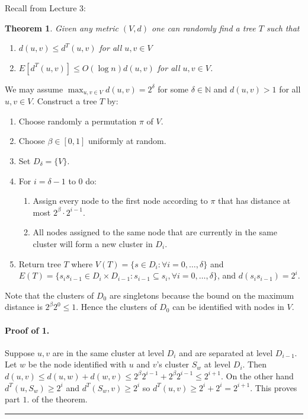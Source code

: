 \documentclass[letterpaper,12pt,oneside,onecolumn]{article}
\newcommand{\N}{\mathbb{N}} \newcommand{\R}{\mathbb{R}}
\newenvironment{proof}{{\bf Proof:  }}{\hfill\rule{2mm}{2mm}}
\newtheorem{theorem}[fact]{Theorem}
\begin{document}
Recall from Lecture $3$:
\begin{theorem}
Given any metric $(V,d)$ one can randomly find a tree $T$ such that
\begin{enumerate}
\item $d(u,v) \leq d^T(u,v)$ for all $u,v\in V$
\item $E[d^T(u,v)] \leq O(\log n) d(u,v)$ for all $u,v\in V$.
\end{enumerate}
\end{theorem}
\begin{proof}
We may assume $\max_{u,v \in V} d(u,v) = 2^\delta$ for some $\delta \in \N$ and $d(u,v) > 1$ for all $u,v\in V$. Construct a tree $T$ by:
\begin{enumerate}
\item Choose randomly a permutation $\pi$ of $V$.
\item Choose $\beta \in [0,1]$ uniformly at random.
\item Set $D_\delta = \{V\}$.
\item For $i = \delta -1$ to $0$ do:
\begin{enumerate}
\item Assign every node to the first node according to $\pi$ that has distance at most $2^\beta \cdot 2^{i-1}$.
\item All nodes assigned to the same node that are currently in the same cluster will form a new cluster in $D_i$.
\end{enumerate}
\item Return tree $T$ where $V(T) = \{s \in D_i : \forall i = 0, \dots, \delta\}$ and $E(T) = \{s_is_{i-1}  \in D_{i}\times D_{i-1}: s_{i-1} \subseteq s_i, \forall i = 0,\dots,\delta\}$, and $d(s_is_{i-1}) = 2^i$.
\end{enumerate}
Note that the clusters of $D_0$ are singletons because the bound on the maximum distance is $2^\beta 2^0 \leq 1$. Hence the clusters of $D_0$ can be identified with nodes in $V$. 
\paragraph{Proof of 1.}
Suppose $u,v$ are in the same cluster at level $D_i$ and are separated at level $D_{i-1}$. Let $w$ be the node identified with $u$ and $v$'s cluster $S_w$ at level $D_i$. Then $d(u,v) \leq d(u,w) + d(w,v) \leq 2^\beta 2^{i-1} + 2^\beta 2^{i-1} \leq 2^{i+1}$. On the other hand $d^T(u, S_w) \geq 2^i$ and $d^T(S_w, v) \geq 2^i$ so $d^T(u,v) \geq 2^i + 2^i = 2^{i+1}$. This proves part $1.$ of the theorem.

\end{proof}
\end{document}
